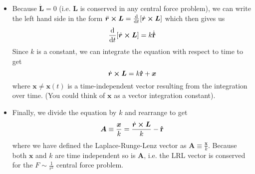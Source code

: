 \documentclass[11pt, a4paper]{article}
\newcommand{\bdot}[1]{\dot{\bm{#1}}} %
\newcommand{\bddot}[1]{\ddot{\bm{#1}}} %
\newcommand{\uvec}[1]{\bm{\hat{\mathbf{#1}}}} %
\begin{document}
\begin{itemize}
	\item Because $ \bdot{L} = 0 $ (i.e. $ \bm{L} $ is conserved in any central force problem), we can write the left hand side in the form $ \bddot{r}\cross \bm{L} = \dv{}{t}[\bdot{r}\cross \bm{L}] $ which then gives us
	\begin{equation*}
		\dv{}{t}[\bdot{r}\cross \bm{L}] = k \dot{\uvec{r}}
	\end{equation*}
	Since $ k $ is a constant, we can integrate the equation with respect to time to get
	\begin{equation*}
		\bdot{r} \cross \bm{L} = k \uvec{r} + \bm{x}
	\end{equation*}
	where $ \bm{x} \neq \bm{x}(t) $ is a time-independent vector resulting from the integration over time. (You could think of $ \bm{x} $ as a vector integration constant).
	
	\item Finally, we divide the equation by $ k $ and rearrange to get
	\begin{equation*}
		\bm{A} \equiv \frac{\bm{x}}{k} =  \frac{\bdot{r} \cross \bm{L}}{k} - \uvec{r} 
	\end{equation*}
	where we have defined the Laplace-Runge-Lenz vector as $ \bm{A} \equiv \frac{\bm{x}}{k} $. Because both $ \bm{x} $ and $ k $ are time independent so is $ \bm{A} $, i.e. the LRL vector is conserved for the $ F \sim \frac{1}{r^{2}} $ central force problem.
	
\end{itemize}
\end{document}
